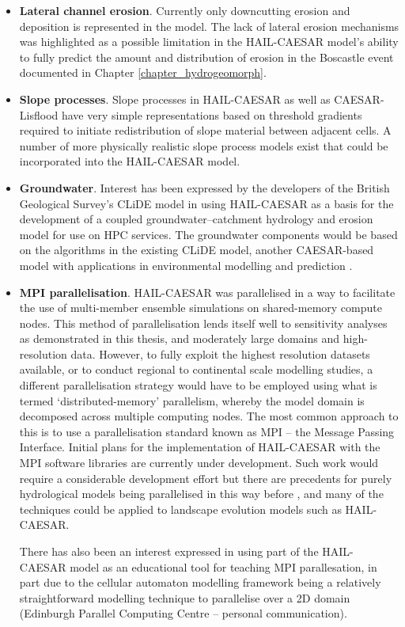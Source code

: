 \begin{itemize}
\item \textbf{Lateral channel erosion}. Currently only downcutting erosion and deposition is represented in the model. The lack of lateral erosion mechanisms was highlighted as a possible limitation in the HAIL-CAESAR model's ability to fully predict the amount and distribution of erosion in the Boscastle event documented in Chapter \ref{chapter_hydrogeomorph}.

\item \textbf{Slope processes}. Slope processes in HAIL-CAESAR as well as CAESAR-Lisflood have very simple representations based on threshold gradients required to initiate redistribution of slope material between adjacent cells. A number of more physically realistic slope process models exist that could be incorporated into the HAIL-CAESAR model.

\item \textbf{Groundwater}. Interest has been expressed by the developers of the British Geological Survey's CLiDE model in using HAIL-CAESAR as a basis for the development of a coupled groundwater--catchment hydrology and erosion model for use on HPC services. The groundwater components would be based on the algorithms in the existing CLiDE model, another CAESAR-based model with applications in environmental modelling and prediction \citep[e.g.][]{Barkwith2015}.

\item \textbf{MPI parallelisation}. HAIL-CAESAR was parallelised in a way to facilitate the use of multi-member ensemble simulations on shared-memory compute nodes. This method of parallelisation lends itself well to sensitivity analyses as demonstrated in this thesis, and moderately large domains and high-resolution data. However, to fully exploit the highest resolution datasets available, or to conduct regional to continental scale modelling studies, a different parallelisation strategy would have to be employed using what is termed `distributed-memory' parallelism, whereby the model domain is decomposed across multiple computing nodes. The most common approach to this is to use a parallelisation standard known as MPI -- the Message Passing Interface. Initial plans for the implementation of HAIL-CAESAR with the MPI software libraries are currently under development. Such work would require a considerable development effort but there are precedents for purely hydrological models being parallelised in this way before \citep{vivoni2011real}, and many of the techniques could be applied to landscape evolution models such as HAIL-CAESAR.

There has also been an interest expressed in using part of the HAIL-CAESAR model as an educational tool for teaching MPI parallesation, in part due to the cellular automaton modelling framework being a relatively straightforward modelling technique to parallelise over a 2D domain (Edinburgh Parallel Computing Centre -- personal communication).

\end{itemize}



